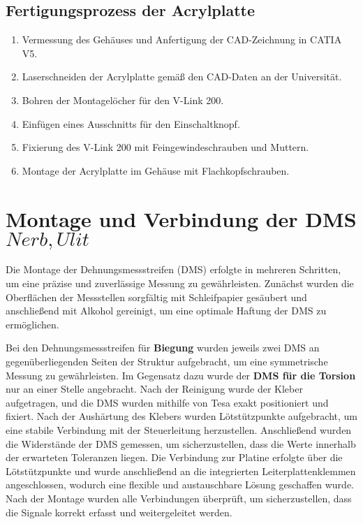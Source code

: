 \subsection{Fertigungsprozess der Acrylplatte}
\begin{enumerate}
    \item Vermessung des Gehäuses und Anfertigung der CAD-Zeichnung in CATIA V5.
    \item Laserschneiden der Acrylplatte gemäß den CAD-Daten an der Universität.
    \item Bohren der Montagelöcher für den V-Link 200.
    \item Einfügen eines Ausschnitts für den Einschaltknopf.
    \item Fixierung des V-Link 200 mit Feingewindeschrauben und Muttern.
    \item Montage der Acrylplatte im Gehäuse mit Flachkopfschrauben.
\end{enumerate}


\newpage
\section{Montage und Verbindung der DMS \(Nerb, Ulit\)}
Die Montage der Dehnungsmessstreifen (DMS) erfolgte in mehreren Schritten, um eine präzise und zuverlässige Messung zu gewährleisten.
Zunächst wurden die Oberflächen der Messstellen sorgfältig mit Schleifpapier gesäubert und anschließend mit Alkohol gereinigt, um eine optimale Haftung der DMS zu ermöglichen.

Bei den Dehnungsmessstreifen für \textbf{Biegung} wurden jeweils zwei DMS an gegenüberliegenden Seiten der Struktur aufgebracht, um eine symmetrische Messung zu gewährleisten.
Im Gegensatz dazu wurde der \textbf{DMS für die Torsion} nur an einer Stelle angebracht.
Nach der Reinigung wurde der Kleber aufgetragen, und die DMS wurden mithilfe von Tesa exakt positioniert und fixiert.
Nach der Aushärtung des Klebers wurden Lötstützpunkte aufgebracht, um eine stabile Verbindung mit der Steuerleitung herzustellen.
Anschließend wurden die Widerstände der DMS gemessen, um sicherzustellen, dass die Werte innerhalb der erwarteten Toleranzen liegen.
Die Verbindung zur Platine erfolgte über die Lötstützpunkte und wurde anschließend an die integrierten Leiterplattenklemmen angeschlossen,
wodurch eine flexible und austauschbare Lösung geschaffen wurde.
Nach der Montage wurden alle Verbindungen überprüft, um sicherzustellen, dass die Signale korrekt erfasst und weitergeleitet werden.


